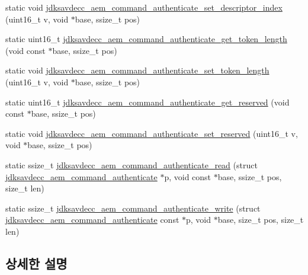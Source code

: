 \begin{DoxyCompactItemize}
\item 
static void \hyperlink{group__command__authenticate_gaa28e92d7200435a04569083ac362f4b7}{jdksavdecc\+\_\+aem\+\_\+command\+\_\+authenticate\+\_\+set\+\_\+descriptor\+\_\+index} (uint16\+\_\+t v, void $\ast$base, ssize\+\_\+t pos)
\item 
static uint16\+\_\+t \hyperlink{group__command__authenticate_gac1a07f001172b01d8199d7a9483aea77}{jdksavdecc\+\_\+aem\+\_\+command\+\_\+authenticate\+\_\+get\+\_\+token\+\_\+length} (void const $\ast$base, ssize\+\_\+t pos)
\item 
static void \hyperlink{group__command__authenticate_gadac2376c5bfbabed04c519a0563bb83d}{jdksavdecc\+\_\+aem\+\_\+command\+\_\+authenticate\+\_\+set\+\_\+token\+\_\+length} (uint16\+\_\+t v, void $\ast$base, ssize\+\_\+t pos)
\item 
static uint16\+\_\+t \hyperlink{group__command__authenticate_ga9867a66fbdcbf3e2dbd6bb195bd7c5ae}{jdksavdecc\+\_\+aem\+\_\+command\+\_\+authenticate\+\_\+get\+\_\+reserved} (void const $\ast$base, ssize\+\_\+t pos)
\item 
static void \hyperlink{group__command__authenticate_gaf13f88d40fd1495d07317425b62c42f5}{jdksavdecc\+\_\+aem\+\_\+command\+\_\+authenticate\+\_\+set\+\_\+reserved} (uint16\+\_\+t v, void $\ast$base, ssize\+\_\+t pos)
\item 
static ssize\+\_\+t \hyperlink{group__command__authenticate_ga7c852288dc51972be0e549e27b6f0e54}{jdksavdecc\+\_\+aem\+\_\+command\+\_\+authenticate\+\_\+read} (struct \hyperlink{structjdksavdecc__aem__command__authenticate}{jdksavdecc\+\_\+aem\+\_\+command\+\_\+authenticate} $\ast$p, void const $\ast$base, ssize\+\_\+t pos, size\+\_\+t len)
\item 
static ssize\+\_\+t \hyperlink{group__command__authenticate_gad9f91fe52de0dc2859fec3f593d704fb}{jdksavdecc\+\_\+aem\+\_\+command\+\_\+authenticate\+\_\+write} (struct \hyperlink{structjdksavdecc__aem__command__authenticate}{jdksavdecc\+\_\+aem\+\_\+command\+\_\+authenticate} const $\ast$p, void $\ast$base, size\+\_\+t pos, size\+\_\+t len)
\end{DoxyCompactItemize}


\subsection{상세한 설명}


